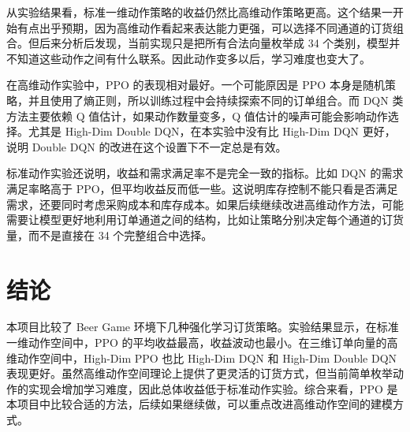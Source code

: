 \documentclass[nohyperref]{article}
\begin{document}
从实验结果看，标准一维动作策略的收益仍然比高维动作策略更高。这个结果一开始有点出乎预期，因为高维动作看起来表达能力更强，可以选择不同通道的订货组合。但后来分析后发现，当前实现只是把所有合法向量枚举成 34 个类别，模型并不知道这些动作之间有什么联系。因此动作变多以后，学习难度也变大了。

在高维动作实验中，PPO 的表现相对最好。一个可能原因是 PPO 本身是随机策略，并且使用了熵正则，所以训练过程中会持续探索不同的订单组合。而 DQN 类方法主要依赖 Q 值估计，如果动作数量变多，Q 值估计的噪声可能会影响动作选择。尤其是 High-Dim Double DQN，在本实验中没有比 High-Dim DQN 更好，说明 Double DQN 的改进在这个设置下不一定总是有效。

标准动作实验还说明，收益和需求满足率不是完全一致的指标。比如 DQN 的需求满足率略高于 PPO，但平均收益反而低一些。这说明库存控制不能只看是否满足需求，还要同时考虑采购成本和库存成本。如果后续继续改进高维动作方法，可能需要让模型更好地利用订单通道之间的结构，比如让策略分别决定每个通道的订货量，而不是直接在 34 个完整组合中选择。

\section{结论}

本项目比较了 Beer Game 环境下几种强化学习订货策略。实验结果显示，在标准一维动作空间中，PPO 的平均收益最高，收益波动也最小。在三维订单向量的高维动作空间中，High-Dim PPO 也比 High-Dim DQN 和 High-Dim Double DQN 表现更好。虽然高维动作空间理论上提供了更灵活的订货方式，但当前简单枚举动作的实现会增加学习难度，因此总体收益低于标准动作实验。综合来看，PPO 是本项目中比较合适的方法，后续如果继续做，可以重点改进高维动作空间的建模方式。
\end{document}
